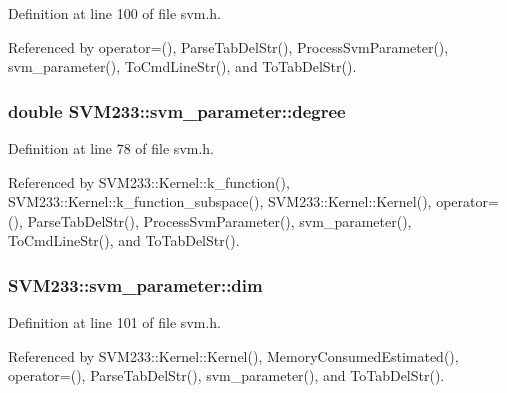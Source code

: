 Definition at line 100 of file svm.\+h.



Referenced by operator=(), Parse\+Tab\+Del\+Str(), Process\+Svm\+Parameter(), svm\+\_\+parameter(), To\+Cmd\+Line\+Str(), and To\+Tab\+Del\+Str().

\subsubsection[{\texorpdfstring{degree}{degree}}]{\setlength{\rightskip}{0pt plus 5cm}double S\+V\+M233\+::svm\+\_\+parameter\+::degree}\hypertarget{struct_s_v_m233_1_1svm__parameter_abb71ffd3ed9223b5239971d18c59f6fe}{}\label{struct_s_v_m233_1_1svm__parameter_abb71ffd3ed9223b5239971d18c59f6fe}


Definition at line 78 of file svm.\+h.



Referenced by S\+V\+M233\+::\+Kernel\+::k\+\_\+function(), S\+V\+M233\+::\+Kernel\+::k\+\_\+function\+\_\+subspace(), S\+V\+M233\+::\+Kernel\+::\+Kernel(), operator=(), Parse\+Tab\+Del\+Str(), Process\+Svm\+Parameter(), svm\+\_\+parameter(), To\+Cmd\+Line\+Str(), and To\+Tab\+Del\+Str().

\subsubsection[{\texorpdfstring{dim}{dim}}]{ S\+V\+M233\+::svm\+\_\+parameter\+::dim}\hypertarget{struct_s_v_m233_1_1svm__parameter_a5828bf6555280c5e3344618339b15ff2}{}\label{struct_s_v_m233_1_1svm__parameter_a5828bf6555280c5e3344618339b15ff2}


Definition at line 101 of file svm.\+h.



Referenced by S\+V\+M233\+::\+Kernel\+::\+Kernel(), Memory\+Consumed\+Estimated(), operator=(), Parse\+Tab\+Del\+Str(), svm\+\_\+parameter(), and To\+Tab\+Del\+Str().

